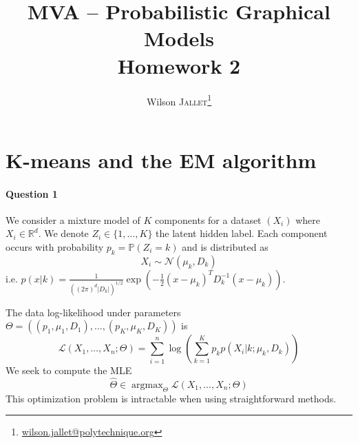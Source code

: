 \documentclass[11pt]{article}
\title{
	MVA -- Probabilistic Graphical Models\\
	{\color{NavyBlue}\sffamily Homework 2}
}
\author{
	Wilson \textsc{Jallet}\thanks{\url{wilson.jallet@polytechnique.org}}}
\newcommand\RR{\mathbb{R}}
\newcommand\PP{\mathbb{P}}
\DeclareMathOperator*{\argmax}{\mathrm{argmax}}
\newcommand{\calN}{\mathcal{N}}
\newcommand{\calL}{\mathcal{L}}
\begin{document}
\maketitle

\section{K-means and the EM algorithm}

\paragraph{Question 1} We consider a mixture model of $K$ components for a dataset $(X_i)$ where $X_i\in\RR^d$. We denote $Z_i \in \{1,\ldots,K\}$ the latent hidden label. Each component occurs with probability $p_k = \PP(Z_i = k)$ and is distributed as
\[
	X_i \sim \calN(\mu_k, D_k)
\]
i.e. $p(x|k) = \frac{1}{((2\pi)^d |D_k|)^{1/2}} \exp(-\frac{1}{2} (x-\mu_k)^T D_k^{-1}(x - \mu_k))$.

The data log-likelihood under parameters $\Theta = ((p_1, \mu_1,D_1),\ldots,(p_K,\mu_K,D_K))$ is
\[
	\calL(X_1,\ldots,X_n; \Theta) =
	\sum_{i=1}^n \log\left(
		\sum_{k=1}^K p_k p(X_i | k; \mu_k, D_k)
	\right)
\]
We seek to compute the MLE
\[
	\widehat\Theta\in \argmax_\Theta \calL(X_1,\ldots,X_n;\Theta)
\]
This optimization problem is intractable when using straightforward methods.
\end{document}
